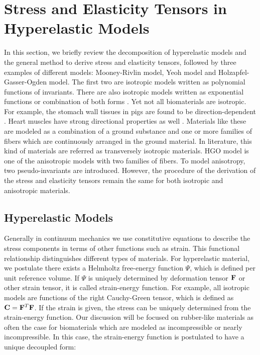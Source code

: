 \section{Stress and Elasticity Tensors in Hyperelastic Models} \label{general}
In this section, we briefly review the decomposition of hyperelastic models and the general method to derive stress and elasticity tensors, followed by three examples of different models: Mooney-Rivlin model, Yeoh model and Holzapfel-Gasser-Ogden model. The first two are isotropic models written as polynomial functions of invariants. There are also isotropic models written as exponential functions or combination of both forms \cite{Fung5, Demiray, Westmann}. 
Yet not all biomaterials are isotropic. For example, the stomach wall tissues in pigs are found to be direction-dependent \cite{Zhao}. Heart muscles have strong directional properties as well \cite{Ramesh}. Materials like these are modeled as a combination of a ground substance and one or more families of fibers which are continuously arranged in the ground material. In literature, this kind of materials are referred as transversely isotropic materials. HGO model is one of the anisotropic models with two families of fibers. To model anisotropy, two pseudo-invariants are introduced. However, the procedure of the derivation of the stress and elasticity tensors remain the same for both isotropic and anisotropic materials.

%
\subsection{Hyperelastic Models}
Generally in continuum mechanics we use constitutive equations to describe the stress components in terms of other functions such as strain. This functional relationship distinguishes different types of materials. For hyperelastic material, we postulate there exists a Helmholtz free-energy function $\Psi$, which is defined per unit reference volume. If $\Psi$ is uniquely determined by deformation tensor $\bold{F}$ or other strain tensor, it is called strain-energy function. For example, all isotropic models are functions of the right Cauchy-Green tensor, which is defined as $\bold{C} = {\bold{F}}^T{\bold{F}}$. If the strain is given, the stress can be uniquely determined from the strain-energy function. Our discussion will be focused on rubber-like materials as often the case for biomaterials which are modeled as incompressible or nearly incompressible. In this case, the strain-energy function is postulated to have a unique decoupled form:


